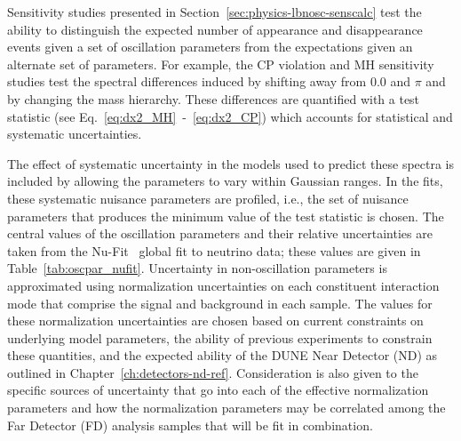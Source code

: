 Sensitivity studies presented in Section~\ref{sec:physics-lbnosc-senscalc} test the ability to distinguish
the expected number of \nue appearance and \numu disappearance events given a set of oscillation parameters
from the expectations given an alternate set of parameters. For example, the CP violation and MH sensitivity
studies test the spectral differences induced by shifting \deltacp away from 0.0 and $\pi$ and by changing the
mass hierarchy. These differences are quantified with a test statistic (see Eq.~\ref{eq:dx2_MH}~-~\ref{eq:dx2_CP}) 
which accounts for statistical and systematic uncertainties. 

The effect of systematic uncertainty in the models used to 
predict these spectra is included by allowing the parameters to vary within Gaussian ranges. In the fits,
these systematic nuisance parameters are profiled, i.e., the set of nuisance parameters that produces the
minimum value of the test statistic is chosen.  The central values of the oscillation
parameters and their relative uncertainties are taken from the Nu-Fit~\cite{Gonzalez-Garcia:2014bfa} global
fit to neutrino data; these values are given in Table~\ref{tab:oscpar_nufit}. Uncertainty in non-oscillation
parameters is approximated using
normalization uncertainties on each constituent interaction mode that comprise the signal and background
in each sample. The values for these normalization uncertainties are chosen based on current constraints
on underlying model parameters, the ability of previous experiments to constrain these quantities,
and the expected ability of the DUNE Near Detector (ND) as outlined in Chapter~\ref{ch:detectors-nd-ref}.
Consideration is also given to the specific sources of uncertainty that go into each of the effective normalization
parameters and how the normalization parameters
may be correlated among the Far Detector (FD) analysis samples that will be fit in combination.



